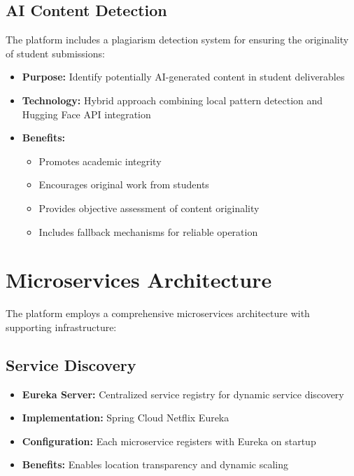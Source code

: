 \documentclass[12pt,a4paper]{report}
\begin{document}
\subsection{AI Content Detection}

The platform includes a plagiarism detection system for ensuring the originality of student submissions:

\begin{itemize}
    \item \textbf{Purpose:} Identify potentially AI-generated content in student deliverables

    \item \textbf{Technology:} Hybrid approach combining local pattern detection and Hugging Face API integration

    \item \textbf{Benefits:}
    \begin{itemize}
        \item Promotes academic integrity
        \item Encourages original work from students
        \item Provides objective assessment of content originality
        \item Includes fallback mechanisms for reliable operation
    \end{itemize}
\end{itemize}

\section{Microservices Architecture}

The platform employs a comprehensive microservices architecture with supporting infrastructure:

\subsection{Service Discovery}

\begin{itemize}
    \item \textbf{Eureka Server:} Centralized service registry for dynamic service discovery
    \item \textbf{Implementation:} Spring Cloud Netflix Eureka
    \item \textbf{Configuration:} Each microservice registers with Eureka on startup
    \item \textbf{Benefits:} Enables location transparency and dynamic scaling
\end{itemize}
\end{document}
